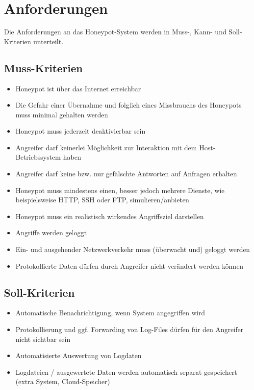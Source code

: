 \chapter{Anforderungen}
\label{ch:Anforderungen}

Die Anforderungen an das Honeypot-System werden in Muss-, Kann- und Soll-Kriterien unterteilt.


\section{Muss-Kriterien}
\label{sec:Muss-Kriterien}
\begin{itemize}
\item Honeypot ist über das Internet erreichbar
\item Die Gefahr einer Übernahme und folglich eines Missbrauchs des Honeypots muss minimal gehalten werden
\item Honeypot muss jederzeit deaktivierbar sein
\item Angreifer darf keinerlei Möglichkeit zur Interaktion mit dem Host-Betriebssystem haben
\item Angreifer darf keine bzw. nur gefälschte Antworten auf Anfragen erhalten
\item Honeypot muss mindestens einen, besser jedoch mehrere Dienste, wie beispielsweise HTTP, SSH oder FTP, simulieren/anbieten
\item Honeypot muss ein realistisch wirkendes Angriffsziel darstellen
\item Angriffe werden geloggt
\item Ein- und ausgehender Netzwerkverkehr muss (überwacht und) geloggt werden
\item Protokollierte Daten dürfen durch Angreifer nicht verändert werden können

\end{itemize}

\newpage

\section{Soll-Kriterien}
\label{sec:Soll-Kriterien}
\begin{itemize}
\item Automatische Benachrichtigung, wenn System angegriffen wird
\item Protokollierung und ggf. Forwarding von Log-Files dürfen für den Angreifer nicht sichtbar sein
\item Automatisierte Auswertung von Logdaten
\item Logdateien / ausgewertete Daten werden automatisch separat gespeichert (extra System, Cloud-Speicher)
\end{itemize}


